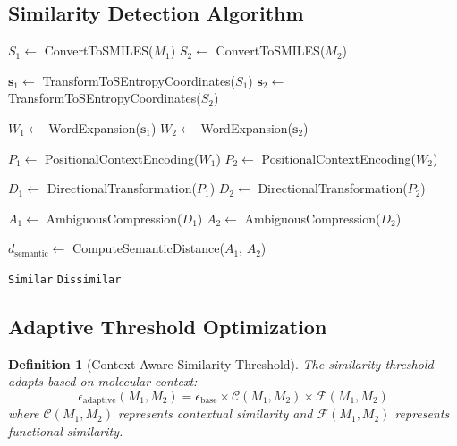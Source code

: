 \documentclass[12pt,a4paper]{article}
\newtheorem{definition}[theorem]{Definition}
\begin{document}
\subsection{Similarity Detection Algorithm}

\begin{algorithm}[H]
\caption{Ultra-Precise Molecular Similarity Detection}
\begin{algorithmic}[1]
    \State $S_1 \gets$ ConvertToSMILES($M_1$)
    \State $S_2 \gets$ ConvertToSMILES($M_2$)

    \State $\mathbf{s}_1 \gets$ TransformToSEntropyCoordinates($S_1$)
    \State $\mathbf{s}_2 \gets$ TransformToSEntropyCoordinates($S_2$)

    \State $W_1 \gets$ WordExpansion($\mathbf{s}_1$)
    \State $W_2 \gets$ WordExpansion($\mathbf{s}_2$)

    \State $P_1 \gets$ PositionalContextEncoding($W_1$)
    \State $P_2 \gets$ PositionalContextEncoding($W_2$)

    \State $D_1 \gets$ DirectionalTransformation($P_1$)
    \State $D_2 \gets$ DirectionalTransformation($P_2$)

    \State $A_1 \gets$ AmbiguousCompression($D_1$)
    \State $A_2 \gets$ AmbiguousCompression($D_2$)

    \State $d_{\text{semantic}} \gets$ ComputeSemanticDistance($A_1$, $A_2$)

        \State \Return \texttt{Similar}
    \Else
        \State \Return \texttt{Dissimilar}
    \EndIf
\EndProcedure
\end{algorithmic}
\end{algorithm}

\subsection{Adaptive Threshold Optimization}

\begin{definition}[Context-Aware Similarity Threshold]
The similarity threshold adapts based on molecular context:
\begin{equation}
\epsilon_{\text{adaptive}}(M_1, M_2) = \epsilon_{\text{base}} \times \mathcal{C}(M_1, M_2) \times \mathcal{F}(M_1, M_2)
\end{equation}
where $\mathcal{C}(M_1, M_2)$ represents contextual similarity and $\mathcal{F}(M_1, M_2)$ represents functional similarity.
\end{definition}
\end{document}
